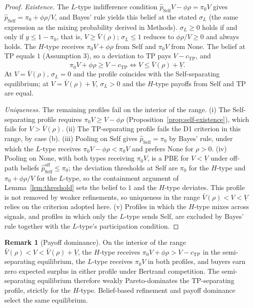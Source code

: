 \documentclass[11pt,letterpaper]{article}
\theoremstyle{definition}
\newtheorem{remark}{Remark}[section]
\begin{document}
\begin{proof}
\textit{Existence.} The $L$-type indifference condition $\hat{p}_{\text{Self}} V - \phi\rho = \pi_0 V$ gives $\hat{p}_{\text{Self}} = \pi_0 + \phi\rho/V$, and Bayes' rule yields this belief at the stated $\sigma_L$ (the same expression as the mixing probability derived in Methods). $\sigma_L \geq 0$ holds if and only if $y \leq 1 - \pi_0$, that is, $V \geq \bar{V}(\rho)$; $\sigma_L \leq 1$ reduces to $\phi\rho/V \geq 0$ and always holds. The $H$-type receives $\pi_0 V + \phi\rho$ from Self and $\pi_0 V$ from None. The belief at TP equals $1$ (Assumption 3), so a deviation to TP pays $V - c_{\text{TP}}$, and
\[
\pi_0 V + \phi\rho \geq V - c_{\text{TP}} \iff V \leq \bar{V}(\rho) + \underline{V}.
\]
At $V = \bar{V}(\rho)$, $\sigma_L = 0$ and the profile coincides with the Self-separating equilibrium; at $V = \bar{V}(\rho) + \underline{V}$, $\sigma_L > 0$ and the $H$-type payoffs from Self and TP are equal.

\textit{Uniqueness.} The remaining profiles fail on the interior of the range. (i) The Self-separating profile requires $\pi_0 V \geq V - \phi\rho$ (Proposition~\ref{prop:self-existence}), which fails for $V > \bar{V}(\rho)$. (ii) The TP-separating profile fails the D1 criterion in this range, by case (b). (iii) Pooling on Self gives $\hat{p}_{\text{Self}} = \pi_0$ by Bayes' rule, under which the $L$-type receives $\pi_0 V - \phi\rho < \pi_0 V$ and prefers None for $\rho > 0$. (iv) Pooling on None, with both types receiving $\pi_0 V$, is a PBE for $V < \underline{V}$ under off-path beliefs $\hat{p}_{\text{Self}}^{\text{off}} \leq \pi_0$; the deviation thresholds at Self are $\pi_0$ for the $H$-type and $\pi_0 + \phi\rho/V$ for the $L$-type, so the containment argument of Lemma~\ref{lem:threshold} sets the belief to $1$ and the $H$-type deviates. This profile is not removed by weaker refinements, so uniqueness in the range $\bar{V}(\rho) < V < \underline{V}$ relies on the criterion adopted here. (v) Profiles in which the $H$-type mixes across signals, and profiles in which only the $L$-type sends Self, are excluded by Bayes' rule together with the $L$-type's participation condition.
\end{proof}

\begin{remark}[Payoff dominance]\label{rem:dominance}
On the interior of the range $\bar{V}(\rho) < V < \bar{V}(\rho) + \underline{V}$, the $H$-type receives $\pi_0 V + \phi\rho > V - c_{\text{TP}}$ in the semi-separating equilibrium, the $L$-type receives $\pi_0 V$ in both profiles, and buyers earn zero expected surplus in either profile under Bertrand competition. The semi-separating equilibrium therefore weakly Pareto-dominates the TP-separating profile, strictly for the $H$-type. Belief-based refinement and payoff dominance select the same equilibrium.
\end{remark}
\end{document}
